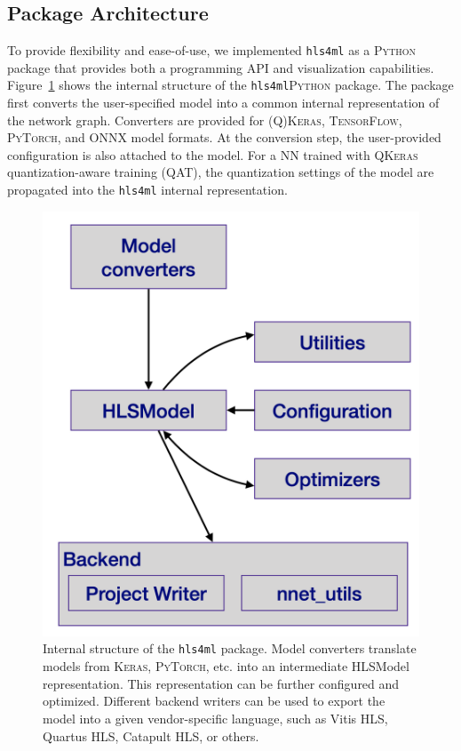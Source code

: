 \documentclass[sigconf]{acmart}
\newcommand{\hlsfml}{\texttt{hls4ml}\xspace}
\begin{document}

\subsection*{Package Architecture}
To provide flexibility and ease-of-use, we implemented \hlsfml as a \textsc{Python} package that provides both a programming API and visualization capabilities.
%
Figure~\ref{fig:arch} shows the internal structure of the \hlsfml \textsc{Python} package. 
The package first converts the user-specified model into a common internal representation of the network graph. 
Converters are provided for \textsc{(Q)Keras}, \textsc{TensorFlow}, \textsc{PyTorch}, and \textsc{ONNX} model formats. 
At the conversion step, the user-provided configuration is also attached to the model. 
For a NN trained with \textsc{QKeras} quantization-aware training (QAT), the quantization settings of the model are propagated into the \hlsfml internal representation. 

\begin{figure}[t!]
\centering
\includegraphics[width=0.5\columnwidth]{Figs/hls4ml-arch.png}
\caption{Internal structure of the \hlsfml package. 
Model converters translate models from \textsc{Keras}, \textsc{PyTorch}, etc. into an intermediate HLSModel representation.  
This representation can be further configured and optimized. 
Different backend writers can be used to export the model into a given vendor-specific language, such as Vitis HLS, Quartus HLS, Catapult HLS, or others.}
\label{fig:arch}
\end{figure}
\end{document}
